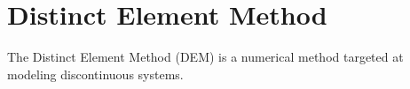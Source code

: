 \section{Distinct Element Method}
The Distinct Element Method (DEM) is a numerical method targeted at modeling discontinuous systems.